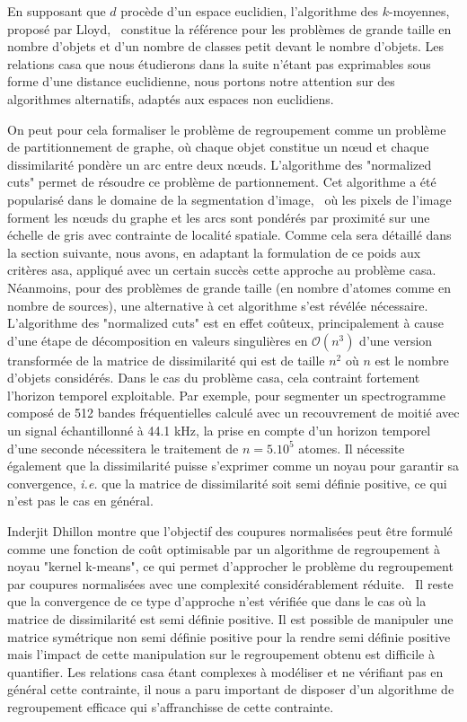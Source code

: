 En supposant que $d$ procède d'un espace euclidien, l'algorithme des $k$-moyennes, proposé par Lloyd,~\cite{lloyd1982least} constitue la référence pour les problèmes de grande taille en nombre d'objets et d'un nombre de classes petit devant le nombre d'objets. Les relations casa que nous étudierons dans la suite n'étant pas exprimables sous forme d'une distance euclidienne, nous portons notre attention sur des algorithmes alternatifs, adaptés aux espaces non euclidiens.

On peut pour cela formaliser le problème de regroupement comme un problème de partitionnement de graphe, où chaque objet constitue un n\oe{}ud et chaque dissimilarité pondère un arc entre deux n\oe{}uds. L'algorithme des "normalized cuts" permet de résoudre ce problème de partionnement. Cet algorithme a été popularisé dans le domaine de la segmentation d'image,~\cite{shi2000normalized} où les pixels de l'image forment les n\oe{}uds du graphe et les arcs sont pondérés par proximité sur une échelle de gris avec contrainte de localité spatiale. Comme cela sera détaillé dans la section suivante, nous avons, en adaptant la formulation de ce poids aux critères asa, appliqué avec un certain succès cette approche au problème casa. Néanmoins, pour des problèmes de grande taille (en nombre d'atomes comme en nombre de sources), une alternative à cet algorithme s'est révélée nécessaire. L'algorithme des "normalized cuts" est en effet coûteux, principalement à cause d'une étape de décomposition en valeurs singulières en $\mathcal{O}(n^3)$ d'une version transformée de la matrice de dissimilarité qui est de taille $n^2$ où $n$ est le nombre d'objets considérés. Dans le cas du problème casa, cela contraint fortement l'horizon temporel exploitable. Par exemple, pour segmenter un spectrogramme composé de 512 bandes fréquentielles calculé avec un recouvrement de moitié avec un signal échantillonné à 44.1 kHz, la prise en compte d'un horizon temporel d'une seconde nécessitera le traitement de $n=5.10^5$ atomes. Il nécessite également que la dissimilarité puisse s'exprimer comme un noyau pour garantir sa convergence, \textit{i.e.} que la matrice de dissimilarité soit semi définie positive, ce qui n'est pas le cas en général.

Inderjit Dhillon montre que l'objectif des coupures normalisées peut être formulé comme une fonction de coût optimisable par un algorithme de regroupement à noyau "kernel k-means", ce qui permet d'approcher le problème du regroupement par coupures normalisées avec une complexité considérablement réduite.~\cite{dhillon2007weighted} Il reste que la convergence de ce type d'approche n'est vérifiée que dans le cas où la matrice de dissimilarité est semi définie positive. Il est possible de manipuler une matrice symétrique non semi définie positive pour la rendre semi définie positive\cite{optimal2003} mais l'impact de cette manipulation sur le regroupement obtenu est difficile à quantifier. Les relations casa étant complexes à modéliser et ne vérifiant pas en général cette contrainte, il nous a paru important de disposer d'un algorithme de regroupement efficace qui s'affranchisse de cette contrainte.

